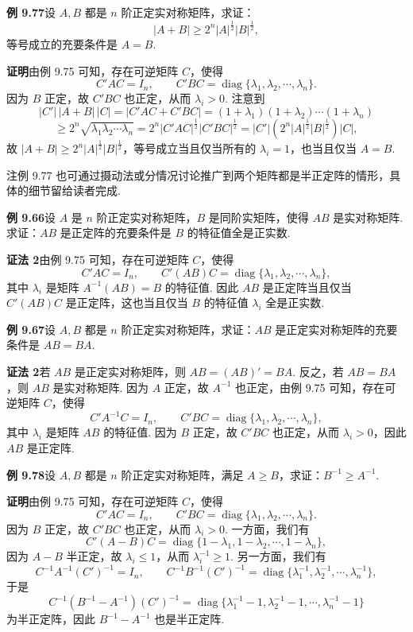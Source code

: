 \documentclass[UTF8,12pt,a4paper,fontset=fandol]{ctexart}
\begin{document}
\noindent\textbf{例 9.77}\quad 设 $A,B$ 都是 $n$ 阶正定实对称矩阵，求证：
\[
|A+B|\ge2^n|A|^{\frac12}|B|^{\frac12},
\]
等号成立的充要条件是 $A=B$.

\noindent\textbf{证明}\quad 由例 9.75 可知，存在可逆矩阵 $C$，使得
\[
C'AC=I_n,\qquad C'BC=\operatorname{diag}\{\lambda_1,\lambda_2,\cdots,\lambda_n\}.
\]
因为 $B$ 正定，故 $C'BC$ 也正定，从而 $\lambda_i>0$. 注意到
\[
|C'|\,|A+B|\,|C|=|C'AC+C'BC|=(1+\lambda_1)(1+\lambda_2)\cdots(1+\lambda_n)
\]
\[
\ge2^n\sqrt{\lambda_1\lambda_2\cdots\lambda_n}
=2^n|C'AC|^{\frac12}|C'BC|^{\frac12}
=|C'|(2^n|A|^{\frac12}|B|^{\frac12})|C|,
\]
故 $|A+B|\ge2^n|A|^{\frac12}|B|^{\frac12}$，等号成立当且仅当所有的 $\lambda_i=1$，也当且仅当 $A=B$.

注\quad 例 9.77 也可通过摄动法或分情况讨论推广到两个矩阵都是半正定阵的情形，具体的细节留给读者完成.

\noindent\textbf{例 9.66}\quad 设 $A$ 是 $n$ 阶正定实对称矩阵，$B$ 是同阶实矩阵，使得 $AB$ 是实对称矩阵. 求证：$AB$ 是正定阵的充要条件是 $B$ 的特征值全是正实数.

\noindent\textbf{证法 2}\quad 由例 9.75 可知，存在可逆矩阵 $C$，使得
\[
C'AC=I_n,\qquad C'(AB)C=\operatorname{diag}\{\lambda_1,\lambda_2,\cdots,\lambda_n\},
\]
其中 $\lambda_i$ 是矩阵 $A^{-1}(AB)=B$ 的特征值. 因此 $AB$ 是正定阵当且仅当 $C'(AB)C$ 是正定阵，这也当且仅当 $B$ 的特征值 $\lambda_i$ 全是正实数.

\noindent\textbf{例 9.67}\quad 设 $A,B$ 都是 $n$ 阶正定实对称矩阵，求证：$AB$ 是正定实对称矩阵的充要条件是 $AB=BA$.

\noindent\textbf{证法 2}\quad 若 $AB$ 是正定实对称矩阵，则 $AB=(AB)'=BA$. 反之，若 $AB=BA$，则 $AB$ 是实对称矩阵. 因为 $A$ 正定，故 $A^{-1}$ 也正定，由例 9.75 可知，存在可逆矩阵 $C$，使得
\[
C'A^{-1}C=I_n,\qquad C'BC=\operatorname{diag}\{\lambda_1,\lambda_2,\cdots,\lambda_n\},
\]
其中 $\lambda_i$ 是矩阵 $AB$ 的特征值. 因为 $B$ 正定，故 $C'BC$ 也正定，从而 $\lambda_i>0$，因此 $AB$ 是正定阵.

\noindent\textbf{例 9.78}\quad 设 $A,B$ 都是 $n$ 阶正定实对称矩阵，满足 $A\ge B$，求证：$B^{-1}\ge A^{-1}$.

\noindent\textbf{证明}\quad 由例 9.75 可知，存在可逆矩阵 $C$，使得
\[
C'AC=I_n,\qquad C'BC=\operatorname{diag}\{\lambda_1,\lambda_2,\cdots,\lambda_n\}.
\]
因为 $B$ 正定，故 $C'BC$ 也正定，从而 $\lambda_i>0$. 一方面，我们有
\[
C'(A-B)C=\operatorname{diag}\{1-\lambda_1,1-\lambda_2,\cdots,1-\lambda_n\},
\]
因为 $A-B$ 半正定，故 $\lambda_i\le1$，从而 $\lambda_i^{-1}\ge1$. 另一方面，我们有
\[
C^{-1}A^{-1}(C')^{-1}=I_n,\qquad
C^{-1}B^{-1}(C')^{-1}=\operatorname{diag}\{\lambda_1^{-1},\lambda_2^{-1},\cdots,\lambda_n^{-1}\},
\]
于是
\[
C^{-1}(B^{-1}-A^{-1})(C')^{-1}
=\operatorname{diag}\{\lambda_1^{-1}-1,\lambda_2^{-1}-1,\cdots,\lambda_n^{-1}-1\}
\]
为半正定阵，因此 $B^{-1}-A^{-1}$ 也是半正定阵.
\end{document}
